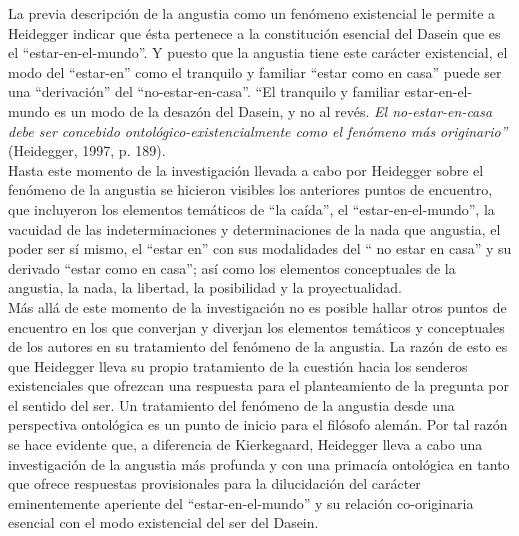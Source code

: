 \begin{refsection}
La previa descripción de la angustia como un fenómeno existencial le permite a Heidegger indicar que ésta pertenece a la constitución esencial del Dasein que es el ``estar-en-el-mundo''. Y puesto que la angustia tiene este carácter existencial, el modo del ``estar-en'' como el tranquilo y familiar ``estar como en casa'' puede ser una ``derivación'' del ``no-estar-en-casa''. ``El tranquilo y familiar estar-en-el-mundo es un modo de la desazón del Dasein, y no al revés. \emph{El no-estar-en-casa debe ser concebido ontológico-existencialmente como el fenómeno más originario''} (Heidegger, 1997, p. 189).\\[-2em]

Hasta este momento de la investigación llevada a cabo por Heidegger sobre el fenómeno de la angustia se hicieron visibles los anteriores puntos de encuentro, que incluyeron los elementos temáticos de ``la caída'', el ``estar-en-el-mundo'', la vacuidad de las indeterminaciones y determinaciones de la nada que angustia, el poder ser sí mismo, el ``estar en'' con sus modalidades del `` no estar en casa'' y su derivado ``estar como en casa''; así como los elementos conceptuales de la angustia, la nada, la libertad, la posibilidad y la proyectualidad.\\[-2em]

Más allá de este momento de la investigación no es posible hallar otros puntos de encuentro en los que converjan y diverjan los elementos temáticos y conceptuales de los autores en su tratamiento del fenómeno de la angustia. La razón de esto es que Heidegger lleva su propio tratamiento de la cuestión hacia los senderos existenciales que ofrezcan una respuesta para el planteamiento de la pregunta por el sentido del ser. Un tratamiento del fenómeno de la angustia desde una perspectiva ontológica es un punto de inicio para el filósofo alemán. Por tal razón se hace evidente que, a diferencia de Kierkegaard, Heidegger lleva a cabo una investigación de la angustia más profunda y con una primacía ontológica en tanto que ofrece respuestas provisionales para la dilucidación del carácter eminentemente aperiente del ``estar-en-el-mundo'' y su relación co-originaria esencial con el modo existencial del ser del Dasein.\\[-2em]


\end{refsection}
